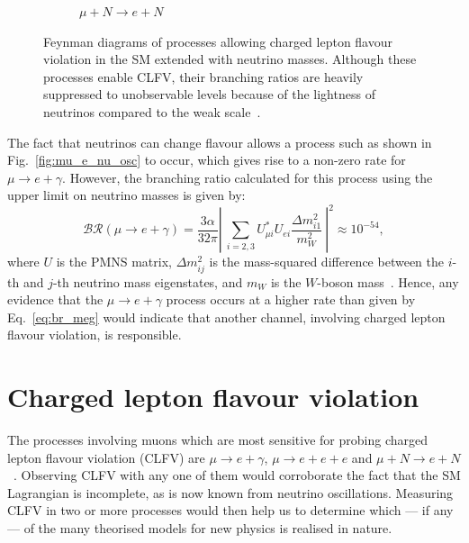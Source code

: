 \begin{figure}
\begin{subfigure}[t]{0.45\textwidth}
    \caption{
        $\mu+N \rightarrow e + N$
    }
    \label{fig:mu-e_conv_SM}
\end{subfigure}
    \caption{
        Feynman diagrams of processes allowing charged lepton flavour
        violation in the SM extended with neutrino masses. Although these
        processes enable CLFV, their branching ratios are heavily suppressed to
        unobservable levels because of the lightness of
        neutrinos compared to the weak scale~\cite{BERNSTEIN201327}.}
\end{figure}

The fact that neutrinos can change flavour allows a process such as shown in
Fig.~\ref{fig:mu_e_nu_osc} to occur, which gives rise to a non-zero rate for
${\mu \rightarrow e + \gamma}$. However, the branching ratio calculated for this
process using the upper limit on neutrino masses is given by:
\begin{equation}\label{eq:br_meg}
\mathcal{BR}(\mu \rightarrow e + \gamma) = \frac{3\alpha}{32\pi} \left|\ \sum_{i=2, 3} U^*_{\mu i} U_{e i} 
\frac{\Delta m^2_{i1}}{m^2_W}  \ \right| ^2 \approx 10^{-54},
\end{equation}
where $U$ is the PMNS matrix, $\Delta m^2_{ij}$ is the mass-squared difference between the
$i$-th and $j$-th neutrino mass eigenstates, and $m_W$ is the $W$-boson
mass~\cite{BERNSTEIN201327}.
Hence, any evidence that the ${\mu \rightarrow e + \gamma}$ process occurs at a higher
rate than given by Eq.~\ref{eq:br_meg} would indicate that another channel,
involving charged lepton flavour violation, is responsible.

\section{Charged lepton flavour violation}

The processes involving muons which are most sensitive for probing charged
lepton flavour violation (CLFV) are ${\mu \rightarrow e + \gamma}$, ${\mu
\rightarrow e+e+e}$ and ${\mu + N \rightarrow e + N}$~\cite{BERNSTEIN201327}.
Observing CLFV with any one of them would corroborate the fact that the SM
Lagrangian is incomplete, as is now known from neutrino oscillations. Measuring
CLFV in two or more processes would then help us to determine which --- if any
--- of the many theorised models for new physics is realised in nature.



